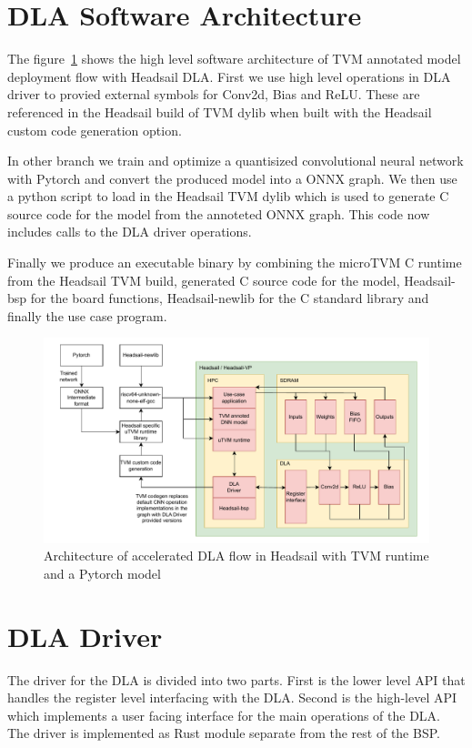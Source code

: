 \documentclass[12pt,a4paper,english
]{tunithesis}
\begin{document}
\section{DLA Software Architecture}
The figure~\ref{fig:architecture} shows the high level software architecture of TVM annotated model deployment flow with Headsail DLA. First we use high level operations in DLA driver to provied external symbols for Conv2d, Bias and ReLU. These are referenced in the Headsail build of TVM dylib when built with the Headsail custom code generation option.

In other branch we train and optimize a quantisized convolutional neural network with Pytorch and convert the produced model into a ONNX graph.
We then use a python script to load in the Headsail TVM dylib which is used to generate C source code for the model from the annoteted ONNX graph. This code now includes calls to the DLA driver operations.

Finally we produce an executable binary by combining the microTVM C runtime from the Headsail TVM build, generated C source code for the model, Headsail-bsp for the board functions, Headsail-newlib for the C standard library and finally the use case program.

\begin{figure}
  \centering
  \includegraphics[width=\linewidth]{img/dla-architecture.pdf}
  \caption{Architecture of accelerated DLA flow in Headsail with TVM runtime and a Pytorch model}
  \label{fig:architecture}
\end{figure}

\section{DLA Driver}
The driver for the DLA is divided into two parts. First is the lower level API that handles the register level interfacing with the DLA. Second is the high-level API which implements a user facing interface for the main operations of the DLA.
The driver is implemented as Rust module separate from the rest of the BSP.
\end{document}

